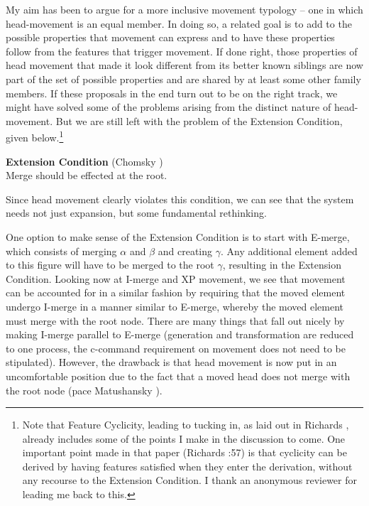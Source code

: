\documentclass[output=paper,colorlinks,citecolor=brown,
]{langscibook}
\begin{document}
My aim has been to argue for a more inclusive movement typology -- one in which head-movement is an equal member.  In doing so, a related goal is to add to the possible properties that movement can express and to have these properties follow from the features that trigger movement.  If done right, those properties of head movement that made it look different from its better known siblings are now part of the set of possible properties and are shared by at least some other family members.  If these proposals in the end turn out to be on the right track, we might have solved  some of the problems arising from the distinct nature of head-movement.  But we are still left with the problem of the Extension Condition, given below.\footnote{Note that Feature Cyclicity, leading to tucking in, as laid out in Richards \citeyearpar{Richards:1997a}, already includes some of the points I make in the discussion to come.  One important point made in that paper (Richards \citeyear{Richards:1997a}:57) is that cyclicity can be derived by having features satisfied when they enter the derivation, without any recourse to the Extension Condition.  I thank an anonymous reviewer for leading me back to this.} 

\ea \textbf{Extension Condition} (Chomsky \citeyear{Chomsky:1995})\\
Merge should be effected at the root.
\z

Since head movement clearly violates this condition, we can see that the system needs not just expansion, but some fundamental rethinking.  

One option to make sense of the Extension Condition is to start with E-merge, which consists of merging $\alpha$ and $\beta$ and creating $\gamma$. Any additional element added to this figure will have to be merged to the root $\gamma$, resulting in the Extension Condition. Looking now at I-merge and XP movement, we see that movement can be accounted for in a similar fashion by requiring that the moved element undergo I-merge in a manner similar to E-merge, whereby the moved element must merge with the root node.  There are many things that fall out nicely by making I-merge parallel to E-merge (generation and transformation are reduced to one process, the c-command requirement on movement does not need to be stipulated).  However, the drawback is that head movement is now put in an uncomfortable position due to the fact that a moved head does not merge with the root node (pace Matushansky \citeyear{Matushansky:2006}).
\end{document}
